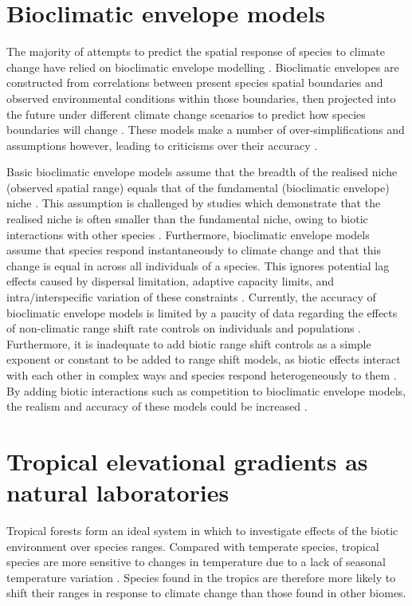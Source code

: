 \documentclass[a4paper,10pt,]{report}
\begin{document}
\section{Bioclimatic envelope models}
The majority of attempts to predict the spatial response of species to climate change have relied on bioclimatic envelope modelling \citep{Pearson2003}. Bioclimatic envelopes are constructed from correlations between present species spatial boundaries and observed environmental conditions within those boundaries, then projected into the future under different climate change scenarios to predict how species boundaries will change \citep[e.g.][]{Berry2002, Peterson2002, Thuiller2005, Araujo2006} \citep{Sinclair2010}. These models make a number of over-simplifications and assumptions however, leading to criticisms over their accuracy \citep{Pearson2003}.

Basic bioclimatic envelope models assume that the breadth of the realised niche (observed spatial range) equals that of the fundamental (bioclimatic envelope) niche \citep{Jump2005, Hoffmann2011}. This assumption is challenged by studies which demonstrate that the realised niche is often smaller than the fundamental niche, owing to biotic interactions with other species \citep{Davis1998, VanderPutten2010, Ettinger2011}. Furthermore, bioclimatic envelope models assume that species respond instantaneously to climate change and that this change is equal in across all individuals of a species. This ignores potential lag effects caused by dispersal limitation, adaptive capacity limits, and intra/interspecific variation of these constraints \citep{Jackson2010, McLaughlin2012}. Currently, the accuracy of bioclimatic envelope models is limited by a paucity of data regarding the effects of non-climatic range shift rate controls on individuals and populations \citep{Wiens2011}. Furthermore, it is inadequate to add biotic range shift controls as a simple exponent or constant to be added to range shift models, as biotic effects interact with each other in complex ways and species respond heterogeneously to them \citep{Parmesan2006, Moritz2008, Doak2010, Feeley2011}. By adding biotic interactions such as competition to bioclimatic envelope models, the realism and accuracy of these models could be increased \citep{Araujo2007}.

\section{Tropical elevational gradients as natural laboratories}
Tropical forests form an ideal system in which to investigate effects of the biotic environment over species ranges. Compared with temperate species, tropical species are more sensitive to changes in temperature due to a lack of seasonal temperature variation \citep{Janzen1967, Ghalambor2006, McCain2009}. Species found in the tropics are therefore more likely to shift their ranges in response to climate change than those found in other biomes.
\end{document}
